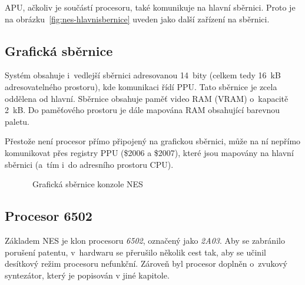 \begin{note}
	APU, ačkoliv je součástí procesoru, také komunikuje na hlavní sběrnici. Proto je na obrázku~\ref{fig:nes-hlavnisbernice} uveden jako další zařízení na sběrnici.
\end{note}

\subsection{Grafická sběrnice}
Systém obsahuje i~vedlejší sběrnici adresovanou 14~bity (celkem tedy 16~kB adresovatelného prostoru), kde komunikaci řídí PPU. Tato sběrnice je zcela oddělena od hlavní. Sběrnice obsahuje paměť video RAM (VRAM) o~kapacitě 2~kB. Do paměťového prostoru je dále mapována RAM obsahující barevnou paletu.

\begin{note}
	Přestože není procesor přímo připojený na grafickou sběrnici, může na ní nepřímo komunikovat přes registry PPU (\$2006 a \$2007), které jsou mapovány na hlavní sběrnici (a~tím i~do adresního prostoru CPU).
\end{note}


\begin{figure}[ht!]
	\centering
	\caption{~Grafická sběrnice konzole NES}\label{fig:nes-grafickasbernice}
\end{figure}

\subsection{Procesor 6502}
Základem NES je klon procesoru \emph{6502}, označený jako \emph{2A03}. Aby se zabránilo porušení patentu, v~hardwaru se přerušilo několik cest tak, aby se učinil desítkový režim procesoru nefunkční. Zároveň byl procesor doplněn o~zvukový syntezátor, který je popisován v jiné kapitole.

